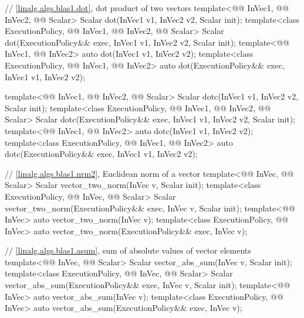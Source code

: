 \begin{codeblock}
{  // \ref{linalg.algs.blas1.dot}, dot product of two vectors
  template<@@ InVec1, @@ InVec2, @@ Scalar>
    Scalar dot(InVec1 v1, InVec2 v2, Scalar init);
  template<class ExecutionPolicy, @@ InVec1, @@ InVec2, @@ Scalar>
    Scalar dot(ExecutionPolicy&& exec, InVec1 v1, InVec2 v2, Scalar init);
  template<@@ InVec1, @@ InVec2>
    auto dot(InVec1 v1, InVec2 v2);
  template<class ExecutionPolicy, @@ InVec1, @@ InVec2>
    auto dot(ExecutionPolicy&& exec, InVec1 v1, InVec2 v2);

  template<@@ InVec1, @@ InVec2, @@ Scalar>
    Scalar dotc(InVec1 v1, InVec2 v2, Scalar init);
  template<class ExecutionPolicy, @@ InVec1, @@ InVec2, @@ Scalar>
    Scalar dotc(ExecutionPolicy&& exec, InVec1 v1, InVec2 v2, Scalar init);
  template<@@ InVec1, @@ InVec2>
    auto dotc(InVec1 v1, InVec2 v2);
  template<class ExecutionPolicy, @@ InVec1, @@ InVec2>
    auto dotc(ExecutionPolicy&& exec, InVec1 v1, InVec2 v2);

  // \ref{linalg.algs.blas1.nrm2}, Euclidean norm of a vector
  template<@@ InVec, @@ Scalar>
    Scalar vector_two_norm(InVec v, Scalar init);
  template<class ExecutionPolicy, @@ InVec, @@ Scalar>
    Scalar vector_two_norm(ExecutionPolicy&& exec, InVec v, Scalar init);
  template<@@ InVec>
    auto vector_two_norm(InVec v);
  template<class ExecutionPolicy, @@ InVec>
    auto vector_two_norm(ExecutionPolicy&& exec, InVec v);

  // \ref{linalg.algs.blas1.asum}, sum of absolute values of vector elements
  template<@@ InVec, @@ Scalar>
    Scalar vector_abs_sum(InVec v, Scalar init);
  template<class ExecutionPolicy, @@ InVec, @@ Scalar>
    Scalar vector_abs_sum(ExecutionPolicy&& exec, InVec v, Scalar init);
  template<@@ InVec>
    auto vector_abs_sum(InVec v);
  template<class ExecutionPolicy, @@ InVec>
    auto vector_abs_sum(ExecutionPolicy&& exec, InVec v);

}
\end{codeblock}
